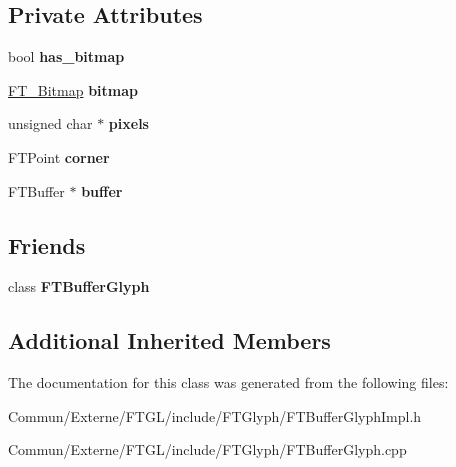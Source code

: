 \subsection*{Private Attributes}
\begin{DoxyCompactItemize}
\item 
bool {\bfseries has\+\_\+bitmap}\hypertarget{class_f_t_buffer_glyph_impl_ab01367ef47dc45da3498ae8c368d4004}{}\label{class_f_t_buffer_glyph_impl_ab01367ef47dc45da3498ae8c368d4004}

\item 
\hyperlink{struct_f_t___bitmap__}{F\+T\+\_\+\+Bitmap} {\bfseries bitmap}\hypertarget{class_f_t_buffer_glyph_impl_ab3bf131b7ffef764dc3bc1a7021e7d7a}{}\label{class_f_t_buffer_glyph_impl_ab3bf131b7ffef764dc3bc1a7021e7d7a}

\item 
unsigned char $\ast$ {\bfseries pixels}\hypertarget{class_f_t_buffer_glyph_impl_a3a71a0c64dee11a902dd089e668a4fb4}{}\label{class_f_t_buffer_glyph_impl_a3a71a0c64dee11a902dd089e668a4fb4}

\item 
F\+T\+Point {\bfseries corner}\hypertarget{class_f_t_buffer_glyph_impl_a3075f2647cae86d1cea9feab86823c26}{}\label{class_f_t_buffer_glyph_impl_a3075f2647cae86d1cea9feab86823c26}

\item 
F\+T\+Buffer $\ast$ {\bfseries buffer}\hypertarget{class_f_t_buffer_glyph_impl_a2614b2d7944c8bef1110c7609376d383}{}\label{class_f_t_buffer_glyph_impl_a2614b2d7944c8bef1110c7609376d383}

\end{DoxyCompactItemize}
\subsection*{Friends}
\begin{DoxyCompactItemize}
\item 
class {\bfseries F\+T\+Buffer\+Glyph}\hypertarget{class_f_t_buffer_glyph_impl_a385e2288042fd77f037a715e7801b451}{}\label{class_f_t_buffer_glyph_impl_a385e2288042fd77f037a715e7801b451}

\end{DoxyCompactItemize}
\subsection*{Additional Inherited Members}


The documentation for this class was generated from the following files\+:\begin{DoxyCompactItemize}
\item 
Commun/\+Externe/\+F\+T\+G\+L/include/\+F\+T\+Glyph/F\+T\+Buffer\+Glyph\+Impl.\+h\item 
Commun/\+Externe/\+F\+T\+G\+L/include/\+F\+T\+Glyph/F\+T\+Buffer\+Glyph.\+cpp\end{DoxyCompactItemize}
